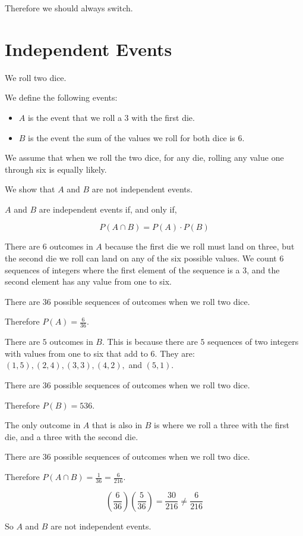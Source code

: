 \documentclass[a4paper,11pt]{article}
\begin{document}
Therefore we should always switch.

\section{Independent Events}

We roll two dice.

We define the following events:

\begin{itemize}
  \item $A$ is the event that we roll a 3 with the first die.
  \item $B$ is the event the sum of the values we roll for both dice is 6.
\end{itemize}

We assume that when we roll the two dice, for any die, rolling any
value one through six is equally likely.

We show that $A$ and $B$ are not independent events.

$A$ and $B$ are independent events if, and only if, 

\begin{equation}
  P \left( A \cap B \right) = P \left( A \right) \cdot P \left( B \right)
\end{equation}

There are 6 outcomes in $A$ because the first die we roll must land on
three, but the second die we roll can land on any of the six possible
values. We count 6 sequences of integers where the first element of
the sequence is a 3, and the second element has any value from one
to six.

There are $36$ possible sequences of outcomes when we roll two dice.

Therefore $P \left( A \right) = \frac{6}{36}$.

There are $5$ outcomes in $B$.  This is because there are $5$ sequences
of two integers with values from one to six that add to 6.  They are:
$\left(1, 5 \right), \left(2, 4 \right), \left(3, 3 \right), 
\left(4, 2 \right),$ and $\left(5, 1 \right)$.

There are $36$ possible sequences of outcomes when we roll two dice.

Therefore $P \left( B \right) = {5}{36}$.

The only outcome in $A$ that is also in $B$ is where we roll a three
with the first die, and a three with the second die.

There are $36$ possible sequences of outcomes when we roll two dice.

Therefore $P\left( A \cap B \right) = \frac{1}{36} = \frac{6}{216}$.

\begin{equation}
  \left( \frac{6}{36} \right) \left( \frac{5}{36} \right) =
    \frac {30}{216} \neq \frac{6}{216}
\end{equation}

So $A$ and $B$ are not independent events.
\printbibliography{}
\end{document}
